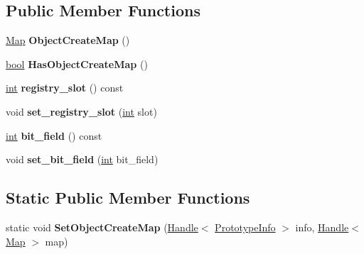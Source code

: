 \subsection*{Public Member Functions}
\begin{DoxyCompactItemize}
\item 
\mbox{\label{classv8_1_1internal_1_1PrototypeInfo_ae8d5e0b063897318a4f31d849f867b4e}} 
\mbox{\hyperlink{classv8_1_1internal_1_1Map}{Map}} {\bfseries Object\+Create\+Map} ()
\item 
\mbox{\label{classv8_1_1internal_1_1PrototypeInfo_a2d8e572e68f9a72a7aa14f5a68c018c8}} 
\mbox{\hyperlink{classbool}{bool}} {\bfseries Has\+Object\+Create\+Map} ()
\item 
\mbox{\label{classv8_1_1internal_1_1PrototypeInfo_a6dd37c472eda5395dc483ad483b1fb9b}} 
\mbox{\hyperlink{classint}{int}} {\bfseries registry\+\_\+slot} () const
\item 
\mbox{\label{classv8_1_1internal_1_1PrototypeInfo_a7274493679b5e347e8a6c3fe8204389f}} 
void {\bfseries set\+\_\+registry\+\_\+slot} (\mbox{\hyperlink{classint}{int}} slot)
\item 
\mbox{\label{classv8_1_1internal_1_1PrototypeInfo_a56640332a46018b5cf0318b071ae7f53}} 
\mbox{\hyperlink{classint}{int}} {\bfseries bit\+\_\+field} () const
\item 
\mbox{\label{classv8_1_1internal_1_1PrototypeInfo_a59bdfd972593cc2ecf904c767bab49df}} 
void {\bfseries set\+\_\+bit\+\_\+field} (\mbox{\hyperlink{classint}{int}} bit\+\_\+field)
\end{DoxyCompactItemize}
\subsection*{Static Public Member Functions}
\begin{DoxyCompactItemize}
\item 
\mbox{\label{classv8_1_1internal_1_1PrototypeInfo_abbf2f81ca59011eecb4ac959a451aac9}} 
static void {\bfseries Set\+Object\+Create\+Map} (\mbox{\hyperlink{classv8_1_1internal_1_1Handle}{Handle}}$<$ \mbox{\hyperlink{classv8_1_1internal_1_1PrototypeInfo}{Prototype\+Info}} $>$ info, \mbox{\hyperlink{classv8_1_1internal_1_1Handle}{Handle}}$<$ \mbox{\hyperlink{classv8_1_1internal_1_1Map}{Map}} $>$ map)
\end{DoxyCompactItemize}
